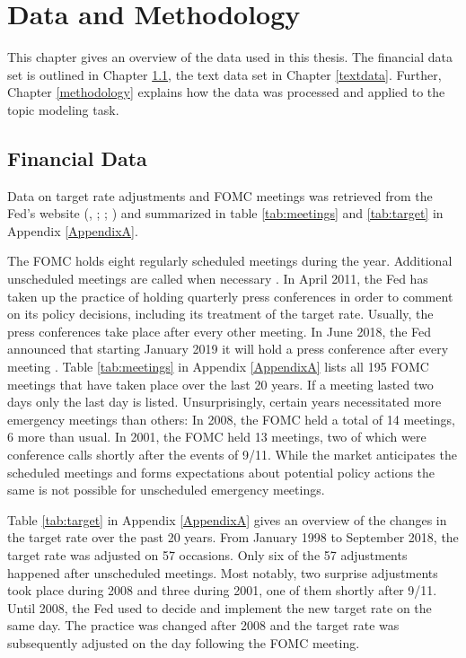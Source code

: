 \documentclass[11pt,a4paper,english,oneside]{book}
\numberwithin{equation}{chapter}
\begin{document}
\chapter{Data and Methodology}\label{D&M}

This chapter gives an overview of the data used in this thesis. The financial data set is outlined in Chapter \ref{Ch:financedata}, the text data set in Chapter \ref{textdata}. Further, Chapter \ref{methodology} explains how the data was processed and applied to the topic modeling task.  

\section{Financial Data}\label{Ch:financedata}

Data on target rate adjustments and FOMC meetings was retrieved from the Fed's website (\citealp{FRS.2018}, \citeyear{FRS.2013}; \citealp{FOMC.2018Archive}; \citeyear{FOMC.2018}) and summarized in table \ref{tab:meetings} and \ref{tab:target} in Appendix \ref{AppendixA}. 

The FOMC holds eight regularly scheduled meetings during the year. Additional unscheduled meetings are called when necessary \citep{FOMC.2018}. In April 2011, the Fed has taken up the practice of holding quarterly press conferences in order to comment on its policy decisions, including its treatment of the target rate. Usually, the press conferences take place after every other meeting. In June 2018, the Fed announced that starting January 2019 it will hold a press conference after every meeting \citep{PressConference.2018}. Table \ref{tab:meetings} in Appendix \ref{AppendixA} lists all 195 FOMC meetings that have taken place over the last 20 years. If a meeting lasted two days only the last day is listed. Unsurprisingly, certain years necessitated more emergency meetings than others: In 2008, the FOMC held a total of 14 meetings, 6 more than usual. In 2001, the FOMC held 13 meetings, two of which were conference calls shortly after the events of 9/11. While the market anticipates the scheduled meetings and forms expectations about potential policy actions the same is not possible for unscheduled emergency meetings. 

Table \ref{tab:target} in Appendix \ref{AppendixA} gives an overview of the changes in the target rate over the past 20 years. From January 1998 to September 2018, the target rate was adjusted on 57 occasions. Only six of the 57 adjustments happened after unscheduled meetings. Most notably, two surprise adjustments took place during 2008 and three during 2001, one of them shortly after 9/11. Until 2008, the Fed used to decide and implement the new target rate on the same day. The practice was changed after 2008 and the target rate was subsequently adjusted on the day following the FOMC meeting. 
\end{document}
